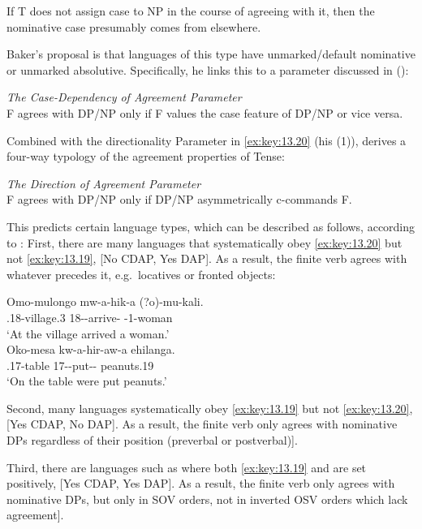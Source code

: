 \documentclass[output=paper]{langsci/langscibook}
\begin{document}
If T does not assign case to NP in the course of agreeing with it, then the
nominative case presumably comes from elsewhere.

Baker’s proposal is that languages of this type have unmarked/default
nominative or unmarked absolutive. Specifically, he links this to a parameter
discussed in \citeauthor{Baker2008} (\citeyear[155, (2)]{Baker2008}):

\ea%
    \label{ex:key:13.19}
    \emph{The Case-Dependency of Agreement Parameter}\\
    F agrees with DP/NP only if F values the case feature of DP/NP or vice
    versa.
\z

Combined with the directionality Parameter in \eqref{ex:key:13.20} (his (1)),
\citet{Baker2008} derives a four-way typology of the agreement properties of
Tense:

\ea\label{ex:key:13.20}
    \emph{The Direction of Agreement Parameter}\\
    F agrees with DP/NP only if DP/NP asymmetrically c-commands F.
\z

This predicts certain language types, which can be described as follows,
according to \citet{Baker2008}: First, there are many  languages
that systematically obey \eqref{ex:key:13.20} but not \eqref{ex:key:13.19}, [No
\gls{CDAP}, Yes \gls{DAP}]. As a result, the finite verb agrees with whatever
precedes it, e.g.\ locatives or fronted objects:\newpage

\ea%
    \label{ex:key:13.21} \citep[158]{Baker2008}
	\ea
	\gll  Omo-mulongo mw-a-hik-a (?o)-mu-kali.\\
    \Loc.18-village.3 18\Sm-\Tns-arrive-\Fv{} \Aug{}-1-woman\\
	\glt     ‘At the village arrived a woman.’\\
    \ex
    \gll Oko-mesa kw-a-hir-aw-a ehilanga.\\
    \Loc.17-table 17\Sm-\Tns-put-\Pass{}-\Fv{} peanuts.19\\
    \glt ‘On the table were put peanuts.’
    \z
\z

Second, many  languages systematically obey \eqref{ex:key:13.19} but
not \eqref{ex:key:13.20}, [Yes \gls{CDAP}, No \gls{DAP}]. As a result, the finite verb only
agrees with nominative DPs regardless of their position (preverbal or
postverbal)].

Third, there are languages such as  where both \eqref{ex:key:13.19} and
 are set positively, [Yes \gls{CDAP}, Yes \gls{DAP}]. As a result, the
finite verb only agrees with nominative DPs, but only in SOV orders, not in
inverted OSV orders which lack agreement].
\end{document}
